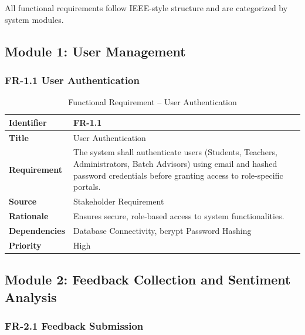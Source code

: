 All functional requirements follow IEEE-style structure and are categorized by system modules.


\subsection{Module 1: User Management}

\subsubsection{FR-1.1 User Authentication}

\begin{table}[H]
\centering
\caption{Functional Requirement -- User Authentication}

\begin{tabularx}{\textwidth}{|p{3cm}|X|}
\hline
\textbf{Identifier} & FR-1.1 \\
\hline
\textbf{Title} & User Authentication \\
\hline
\textbf{Requirement} & The system shall authenticate users (Students, Teachers, Administrators, Batch Advisors) using email and hashed password credentials before granting access to role-specific portals. \\
\hline
\textbf{Source} & Stakeholder Requirement \\
\hline
\textbf{Rationale} & Ensures secure, role-based access to system functionalities. \\
\hline
\textbf{Dependencies} & Database Connectivity, bcrypt Password Hashing \\
\hline
\textbf{Priority} & High \\
\hline
\end{tabularx}

\end{table}



\subsection{Module 2: Feedback Collection and Sentiment Analysis}

\subsubsection{FR-2.1 Feedback Submission}

